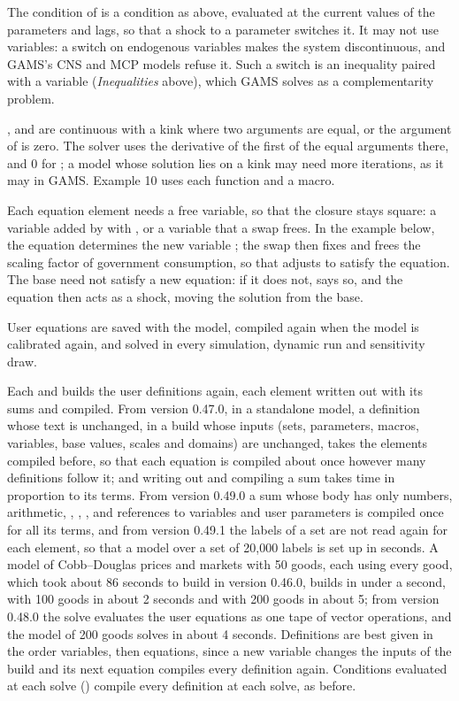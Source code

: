 The condition of  is a condition as above, evaluated at the
current values of the parameters and lags, so that a shock to a parameter
switches it. It may not use variables: a switch on endogenous variables makes
the system discontinuous, and GAMS's CNS and MCP models refuse it. Such a
switch is an inequality paired with a variable (\emph{Inequalities} above),
which GAMS solves as a complementarity problem.

,  and  are continuous with a kink where two
arguments are equal, or the argument of  is zero. The solver uses
the derivative of the first of the equal arguments there, and 0 for
; a model whose solution lies on a kink may need more iterations,
as it may in GAMS. Example 10 uses each function and a macro.


Each equation element needs a free variable, so that the closure stays square:
a variable added by  with , or a variable that
a swap frees. In the example below, the equation determines the new variable
; the swap then fixes  and frees the scaling factor of
government consumption, so that  adjusts to satisfy the equation. The
base need not satisfy a new equation: if it does not,  says
so, and the equation then acts as a shock, moving the solution from the base.

User equations are saved with the model, compiled again when the model is
calibrated again, and solved in every simulation, dynamic run and sensitivity
draw.


Each  and  builds the user definitions
again, each element written out with its sums and compiled. From version
0.47.0, in a standalone model, a definition whose text is unchanged, in a
build whose inputs (sets, parameters, macros, variables, base values, scales
and domains) are unchanged, takes the elements compiled before, so that each
equation is compiled about once however many definitions follow it; and
writing out and compiling a sum takes time in proportion to its terms. From
version 0.49.0 a sum whose body has only numbers, arithmetic, ,
, ,  and references to variables and user
parameters is compiled once for all its terms, and from version 0.49.1 the
labels of a set are not read
again for each element, so that a model over a set of 20,000 labels is set
up in seconds. A model of Cobb--Douglas prices and markets with 50 goods,
each using every good, which took about 86 seconds to build in version
0.46.0, builds in under a second, with 100 goods in about 2 seconds and with
200 goods in about 5; from version 0.48.0 the solve evaluates the user
equations as one tape of vector operations, and the model of 200 goods
solves in about 4 seconds. Definitions are best given in the order
variables, then equations, since a new variable changes the inputs of the
build and its next equation compiles every definition again.
Conditions evaluated at each solve ()
compile every definition at each solve, as before.

